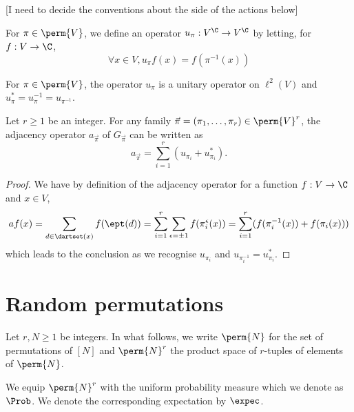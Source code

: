 [I need to decide the conventions about the side of the actions below]

\begin{definition}
  \label{def:u_pi}
  For $\pi \in \perm{V}$, we define an operator $u_\pi : V^{\C} \rightarrow V^{\C}$ by
  letting, for $f : V \rightarrow \C$,
  \begin{equation*}
    \forall x \in V,
    u_\pi f(x) = f(\pi^{-1}(x))
  \end{equation*}
\end{definition}

\begin{lemma}
  \label{lem:u_pi_unitary}
  For $\pi \in \perm{V}$, the operator $u_\pi$ is a unitary operator on $\ell^2(V)$
  and $u_\pi^*=u_\pi^{-1}=u_{\pi^{-1}}$.
\end{lemma}

\begin{lemma}
  \label{lem:adjacency_of_pi}
  Let $r \geq 1$ be an integer. For any family $\vec{\pi} = (\pi_1, \ldots, \pi_r) \in \perm{V}^r$,
  the adjacency operator $a_{\vec{\pi}}$ of $G_{\vec{\pi}}$ can be written as
  \begin{equation*}
    a_{\vec{\pi}} = \sum_{i=1}^r (u_{\pi_i} + u_{\pi_i}^*).
  \end{equation*}
\end{lemma}

\begin{proof}
  We have by definition of the adjacency operator for a function $f : V \rightarrow \C$
  and $x \in V$,
  \begin{equation*}
    af(x)
    = \sum_{d \in \dartset(x)} f(\ept(d))
    = \sum_{i=1}^r \sum_{\epsilon = \pm 1} f(\pi_i^\epsilon(x))
    =  \sum_{i=1}^r (f(\pi_i^{-1}(x)) + f(\pi_i(x)))
  \end{equation*}
  which leads to the conclusion as we recognise $u_{\pi_i}$ and $u_{\pi_i^{-1}} = u_{\pi_i}^*$.
\end{proof}

\section{Random permutations}

Let $r, N \geq 1$ be integers.
In what follows, we write $\perm{N}$ for the set of permutations of $[N]$
and $\perm{N}^r$ the product space of $r$-tuples of elements of $\perm{N}$.

\begin{definition}
  \label{def:probability_measure}
  We equip $\perm{N}^r$ with the uniform probability measure which we denote as
  $\Prob$. We denote the corresponding expectation by $\expec$.
\end{definition}

